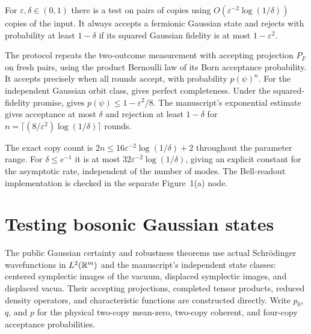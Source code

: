 \begin{corollary}\label{cor:fermion-testing}
  \par
  \leanok
  For $\varepsilon,\delta\in(0,1)$ there is a test on pairs of copies using
  $O(\varepsilon^{-2}\log(1/\delta))$ copies of the input. It always accepts
  a fermionic Gaussian state and rejects with probability at least $1-\delta$
  if its squared Gaussian fidelity is at most $1-\varepsilon^2$.

  The protocol repeats the two-outcome measurement with accepting projection
  $P_F$ on fresh pairs, using the product Bernoulli law of its Born
  acceptance probability. It accepts precisely when all rounds accept,
  with probability $p(\psi)^n$.
  For the independent Gaussian orbit class, 
  gives perfect completeness. Under the squared-fidelity promise,
   gives $p(\psi)\le1-\varepsilon^2/8$.
  The manuscript's exponential estimate gives acceptance at most $\delta$
  and rejection at least $1-\delta$ for
  $n=\lceil(8/\varepsilon^2)\log(1/\delta)\rceil$ rounds.

  The exact copy count is $2n\le16\varepsilon^{-2}\log(1/\delta)+2$
  throughout the parameter range. For $\delta\le e^{-1}$ it is at most
  $32\varepsilon^{-2}\log(1/\delta)$, giving an explicit constant for the
  asymptotic rate, independent of the number of modes.
  The Bell-readout implementation is checked in the separate Figure~1(a) node.
\end{corollary}

\chapter{Testing bosonic Gaussian states}\label{sec:bosons}

The public Gaussian certainty and robustness theorems use actual Schrödinger
wavefunctions in $L^2(\mathbb{R}^m)$ and the manuscript's independent state classes:
centered symplectic images of the vacuum, displaced symplectic images, and
displaced vacua. Their accepting projections, completed tensor products,
reduced density operators, and characteristic functions are constructed directly.
Write $p_0$, $q$, and $p$ for the physical two-copy mean-zero, two-copy coherent,
and four-copy acceptance probabilities.

